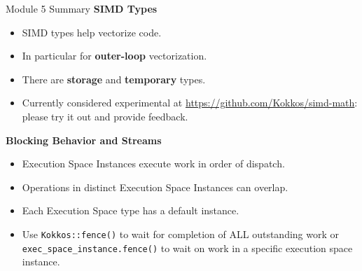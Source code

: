 \begin{frame}[fragile]{Module 5 Summary}
\textbf{SIMD Types}
	\begin{itemize}
		\item{SIMD types help vectorize code.}
		\item{In particular for \textbf{outer-loop} vectorization.}
		\item{There are \textbf{storage} and \textbf{temporary} types.}
		\item{Currently considered experimental at \url{https://github.com/Kokkos/simd-math}: please try it out and provide feedback.}
	\end{itemize}

\textbf{Blocking Behavior and Streams}
  \begin{itemize}
    \item{Execution Space Instances execute work in order of dispatch.}
    \item{Operations in distinct Execution Space Instances can overlap.}
    \item{Each Execution Space type has a default instance.}
    \item{Use \texttt{Kokkos::fence()} to wait for completion of ALL outstanding work or \texttt{exec\_space\_instance.fence()} to wait on work in a specific execution space instance.}
  \end{itemize}

\end{frame}

